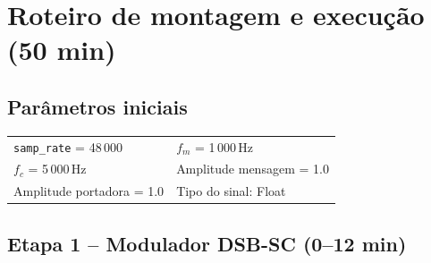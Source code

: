 \documentclass[11pt,a4paper]{article}
\begin{document}
\section{Roteiro de montagem e execução (50 min)}

\subsection*{Parâmetros iniciais}

\begin{center}
\begin{tabular}{l l}
  \texttt{samp\_rate} = 48\,000 & $f_m$ = 1\,000\,Hz \\
  $f_c$ = 5\,000\,Hz            & Amplitude mensagem = 1.0 \\
  Amplitude portadora = 1.0     & Tipo do sinal: Float \\
\end{tabular}
\end{center}

\subsection*{Etapa 1 -- Modulador DSB-SC (0--12 min)}
\end{document}
